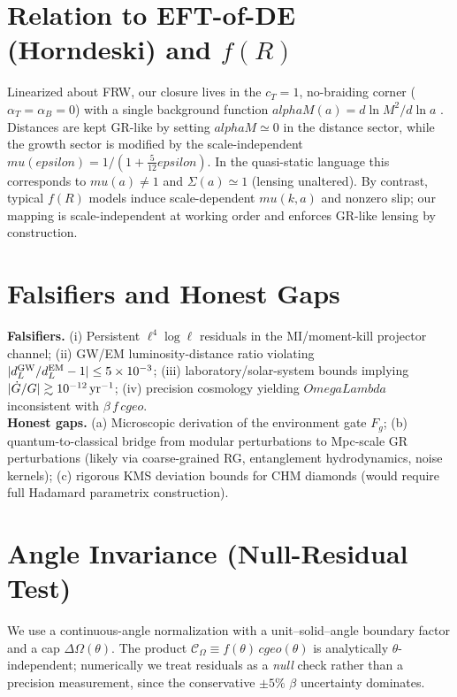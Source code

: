\documentclass[aps,prd,onecolumn,superscriptaddress,nofootinbib]{revtex4-2}
\def\OmL{OmegaLambda}%
\def\cgeo{cgeo}%
\def\alphaM{alphaM}%
\def\eps{epsilon}%
\def\mu{mu}%
\def\alpha{alpha}%
\def\alpha_M{alphaM}%
\def\Omega_\Lambda{OmegaLambda}%
\providecommand{\OmL}{\Omega_\Lambda}
\providecommand{\cgeo}{c_{\rm geo}}
\providecommand{\alphaM}{\alpha_M}
\providecommand{\eps}{\varepsilon}
\begin{document}
\section{Relation to EFT-of-DE (Horndeski) and \texorpdfstring{$f(R)$}{f(R)}}
\label{sec:eft}
Linearized about FRW, our closure lives in the \(c_T=1\), no-braiding corner (\(\alpha_T=\alpha_B=0\)) with a single background function \(\alphaM(a)=d\ln M^2/d\ln a\) \cite{BelliniSawicki2014}. Distances are kept GR-like by setting \(\alphaM\simeq 0\) in the distance sector, while the growth sector is modified by the scale-independent \(\mu(\eps)=1/(1+\tfrac{5}{12}\eps)\). In the quasi-static language this corresponds to \(\mu(a)\neq 1\) and \(\Sigma(a)\simeq 1\) (lensing unaltered). By contrast, typical \(f(R)\) models induce scale-dependent \(\mu(k,a)\) and nonzero slip; our mapping is scale-independent at working order and enforces GR-like lensing by construction.

\section{Falsifiers and Honest Gaps}
\label{sec:falsifiers}
\textbf{Falsifiers.} (i) Persistent \(\ell^4\log\ell\) residuals in the MI/moment-kill projector channel; (ii) GW/EM luminosity-distance ratio violating \(|d_L^{\rm GW}/d_L^{\rm EM}-1|\le 5\times 10^{-3}\); (iii) laboratory/solar-system bounds implying \(|\dot G/G|\gtrsim 10^{-12}\,{\rm yr}^{-1}\); (iv) precision cosmology yielding \(\OmL\) inconsistent with \(\beta\,f\,\cgeo\).\\
\textbf{Honest gaps.} (a) Microscopic derivation of the environment gate \(F_g\); (b) quantum-to-classical bridge from modular perturbations to Mpc-scale GR perturbations (likely via coarse-grained RG, entanglement hydrodynamics, noise kernels); (c) rigorous KMS deviation bounds for CHM diamonds (would require full Hadamard parametrix construction).

\section{Angle Invariance (Null-Residual Test)}
\label{sec:theta}
We use a continuous-angle normalization with a unit--solid--angle boundary factor and a cap \(\Delta\Omega(\theta)\). The product \(\mathcal C_\Omega\equiv f(\theta)\, \cgeo(\theta)\) is analytically \(\theta\)-independent; numerically we treat residuals as a \emph{null} check rather than a precision measurement, since the conservative \(\pm 5\%\) \(\beta\) uncertainty dominates.
\end{document}
